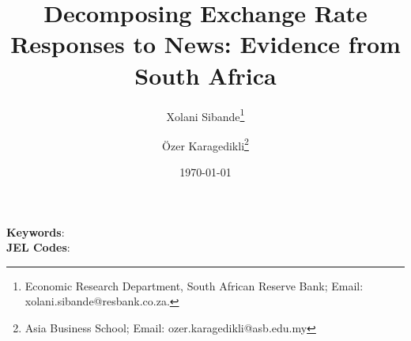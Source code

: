 \title{Decomposing Exchange Rate Responses to News: Evidence from South Africa}





\author {Xolani Sibande\footnote{Economic Research Department, South African Reserve Bank; Email: xolani.sibande@resbank.co.za.} \and
{\"Ozer Karagedikli\footnote{Asia Business School; Email: ozer.karagedikli@asb.edu.my}}}


\date{\today}
\maketitle

\begin{abstract}


\end{abstract}

\noindent\textbf{Keywords}: \\
\textbf{JEL Codes}: 
\newpage